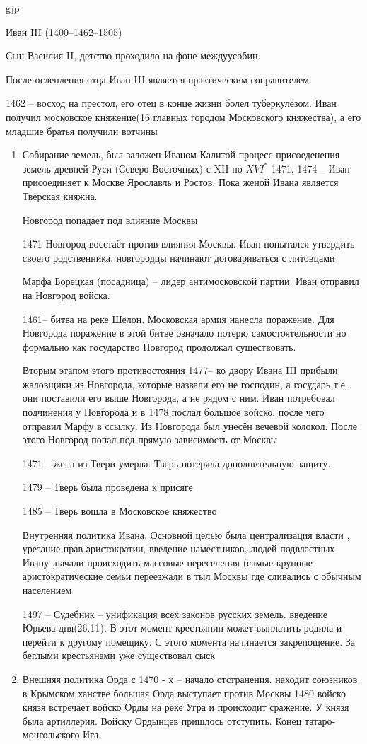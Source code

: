 gjp	 \documentclass[12pt,a4paper]{article}
\begin{document}
Иван III (1400--1462--1505)

Сын Василия II, детство проходило на фоне междуусобиц. 

После ослепления отца Иван III является практическим соправителем.

1462 -- восход на престол, его отец в конце жизни болел туберкулёзом. Иван получил московское княжение(16 главных городом Московского княжества), а его младшие братья
 получили вотчины
\begin{enumerate}
\item Собирание земель, был заложен Иваном Калитой
процесс присоеденения земель древней Руси (Северо-Восточных) с XII по  $XVI^*$
1471, 1474 -- Иван присоединяет к Москве Ярославль и Ростов. Пока женой Ивана является Тверская княжна.

Новгород попадает под влияние Москвы 

1471 Новгород восстаёт против влияния Москвы.  Иван попытался утвердить своего родственника. новгородцы начинают договариваться с литовцами

Марфа Борецкая (посадница) -- лидер антимосковской партии. Иван отправил на Новгород войска.

1461-- битва на реке Шелон. Московская армия нанесла поражение. Для Новгорода поражение в этой битве означало потерю самостоятельности но формально как государство Новгород продолжал существовать.

Вторым этапом этого противостояния 
1477-- ко двору Ивана III прибыли жаловщики из Новгорода, которые назвали его не господин, а государь т.е. они поставили его выше Новгорода, а не рядом  с ним. Иван потребовал подчинения у Новгорода и в 1478 послал большое войско, после чего отправил Марфу в ссылку. Из Новгорода был унесён вечевой колокол. После этого Новгород попал под прямую зависимость от Москвы

1471 -- жена из Твери умерла. Тверь потеряла дополнительную защиту. 

1479 -- Тверь была проведена к присяге 

1485 -- Тверь вошла в Московское княжество 

Внутренняя политика Ивана. Основной целью была централизация власти , урезание прав аристократии, введение наместников,  людей подвластных Ивану  ,начали происходить массовые переселения (самые крупные аристократические семьи переезжали в тыл Москвы где сливались с обычным населением 

1497 -- Судебник -- унификация всех законов русских земель. введение Юрьева дня(26.11). В этот момент крестьянин может выплатить родила и перейти к другому помещику.  С этого момента начинается закрепощение. За беглыми крестьянами уже существовал сыск 
\item Внешняя политика
Орда
с 1470 - х -- начало отстранения. находит союзников в Крымском ханстве 
большая Орда выступает против Москвы
1480 войско князя встречает войско Орды на реке Угра и происходит сражение. У князя была артиллерия. Войску Ордынцев пришлось отступить. Конец татаро-монгольского Ига.


\end{enumerate}
\end{document}

